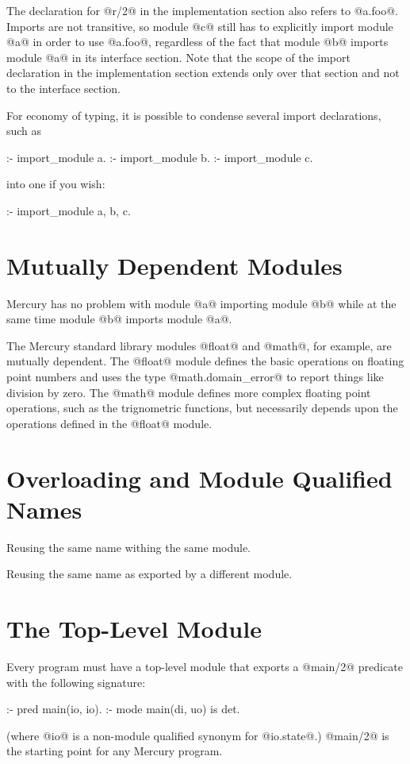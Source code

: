 The declaration for @r/2@ in the implementation section also refers to
@a.foo@.  Imports are not transitive, so module @c@ still has to
explicitly import module @a@ in order to use @a.foo@, regardless of the
fact that module @b@ imports module @a@ in its interface section.  Note
that the scope of the import declaration in the implementation section
extends only over that section and not to the interface section.

For economy of typing, it is possible to condense several import
declarations, such as
\begin{myverbatim}
:- import_module a.
:- import_module b.
:- import_module c.
\end{myverbatim}
into one if you wish:
\begin{myverbatim}
:- import_module a, b, c.
\end{myverbatim}

\section{Mutually Dependent Modules}

Mercury has no problem with module @a@ importing module @b@ while at the
same time module @b@ imports module @a@.

The Mercury standard library modules @float@ and @math@, for example,
are mutually dependent.  The @float@ module defines the basic operations
on floating point numbers and uses the type @math.domain_error@ to
report things like division by zero.  The @math@ module defines more
complex floating point operations, such as the trignometric functions,
but necessarily depends upon the operations defined in the @float@
module.

\section{Overloading and Module Qualified Names}

Reusing the same name withing the same module.

Reusing the same name as exported by a different module.

\section{The Top-Level Module}

Every program must have a top-level module that exports a @main/2@
predicate with the following signature:
\begin{myverbatim}
:- pred main(io, io).
:- mode main(di, uo) is det.
\end{myverbatim}
(where @io@ is a non-module qualified synonym for @io.state@.)
@main/2@ is the starting point for any Mercury program.

